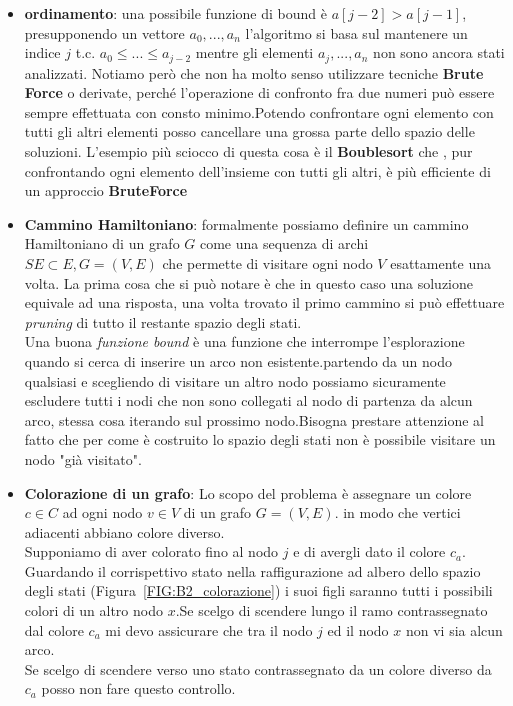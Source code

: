 \documentclass[a4paper]{article}
\begin{document}
\begin{itemize}
	\item \textbf{ordinamento}: una possibile funzione di bound è $a[j-2] > a[j-1]$, presupponendo un vettore $a_0, ... , a_n$ l'algoritmo si basa sul mantenere un indice $j$ t.c. $a_0 \leq ... \leq a_{j-2}$ mentre gli elementi $a_{j}, ..., a_{n}$ non sono ancora stati analizzati.
	Notiamo però che non ha molto senso utilizzare tecniche \textbf{Brute Force} o derivate, perché l'operazione di confronto fra due numeri può essere sempre effettuata con consto minimo.Potendo confrontare ogni elemento con tutti gli altri elementi posso cancellare una grossa parte dello spazio delle soluzioni.
	L'esempio più sciocco di questa cosa è il \textbf{Boublesort} che , pur confrontando ogni elemento dell'insieme con tutti gli altri, è più efficiente di un approccio \textbf{BruteForce}
	\item \textbf{Cammino Hamiltoniano}: formalmente possiamo definire un cammino Hamiltoniano di un grafo $G$ come una sequenza di archi $SE \subset E, G= (V,E)$ che permette di visitare ogni nodo $V$ esattamente una volta.
	La prima cosa che si può notare è che in questo caso una soluzione equivale ad una risposta, una volta trovato il primo cammino si può effettuare \textit{pruning} di tutto il restante spazio degli stati.\\
	Una buona \textit{funzione bound} è una funzione che interrompe l'esplorazione quando si cerca di inserire un arco non esistente.partendo da un nodo qualsiasi e scegliendo di visitare un altro nodo possiamo sicuramente escludere tutti i nodi che non sono collegati al nodo di partenza da alcun arco, stessa cosa iterando sul prossimo nodo.Bisogna prestare attenzione al fatto che per come è costruito lo spazio degli stati non è possibile visitare un nodo "già visitato".
	\item \textbf{Colorazione di un grafo}: Lo scopo del problema è assegnare un colore $c \in C$ ad ogni nodo $v \in V$ di un grafo $G=(V,E)$. in modo che vertici adiacenti abbiano colore diverso.\\
	Supponiamo di aver colorato fino al nodo $j$ e di avergli dato il colore $c_a$.
	Guardando il corrispettivo stato nella raffigurazione ad albero dello spazio degli stati (Figura~\ref{FIG:B2_colorazione}) i suoi figli saranno tutti i possibili colori di un altro nodo $x$.Se scelgo di scendere lungo il ramo contrassegnato dal colore $c_a$ mi devo assicurare che tra il nodo $j$ ed il nodo $x$ non vi sia alcun arco.\\
Se scelgo di scendere verso uno stato contrassegnato da un colore diverso da $c_a$ posso non fare questo controllo.\\

\end{itemize}
\end{document}
